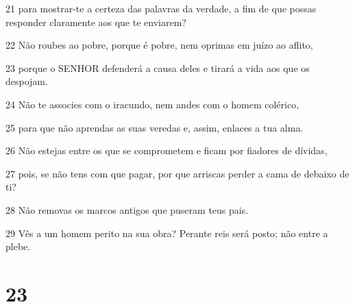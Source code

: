\par 21 para mostrar-te a certeza das palavras da verdade, a fim de que possas responder claramente aos que te enviarem?
\par 22 Não roubes ao pobre, porque é pobre, nem oprimas em juízo ao aflito,
\par 23 porque o SENHOR defenderá a causa deles e tirará a vida aos que os despojam.
\par 24 Não te associes com o iracundo, nem andes com o homem colérico,
\par 25 para que não aprendas as suas veredas e, assim, enlaces a tua alma.
\par 26 Não estejas entre os que se comprometem e ficam por fiadores de dívidas,
\par 27 pois, se não tens com que pagar, por que arriscas perder a cama de debaixo de ti?
\par 28 Não removas os marcos antigos que puseram teus pais.
\par 29 Vês a um homem perito na sua obra? Perante reis será posto; não entre a plebe.

\chapter{23}

